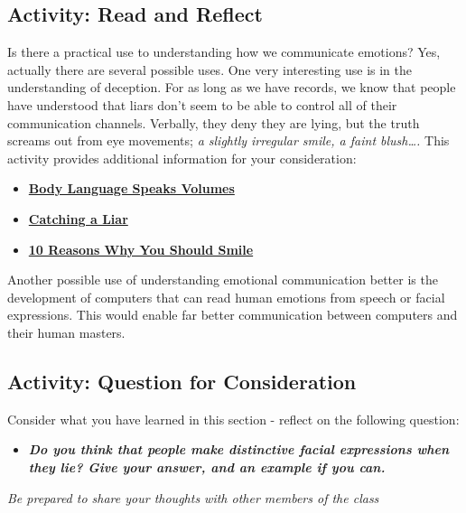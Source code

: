 \documentclass[
]{book}
\providecommand{\tightlist}{%
  \setlength{\itemsep}{0pt}\setlength{\parskip}{0pt}}
\begin{document}
\hypertarget{activity-read-and-reflect-13}{%
\subsection*{Activity: Read and Reflect}\label{activity-read-and-reflect-13}}

\begin{reflect}
Is there a practical use to understanding how we communicate emotions? Yes, actually there are several possible uses. One very interesting use is in the understanding of deception. For as long as we have records, we know that people have understood that liars don't seem to be able to control all of their communication channels. Verbally, they deny they are lying, but the truth screams out from eye movements; \emph{a slightly irregular smile, a faint blush\ldots.} This activity provides additional information for your consideration:

\begin{itemize}
\tightlist
\item
  \href{http://www.positive-way.com/body.htm}{\textbf{Body Language Speaks Volumes}}\\
\item
  \href{http://www.sciencedaily.com/releases/1999/05/990528003127.htm}{\textbf{Catching a Liar}}\\
\item
  \href{https://www.lifehack.org/358476/10-reasons-you-should-smile-more-often}{\textbf{10 Reasons Why You Should Smile}}
\end{itemize}

Another possible use of understanding emotional communication better is the development of computers that can read human emotions from speech or facial expressions. This would enable far better communication between computers and their human masters.
\end{reflect}

\hypertarget{activity-question-for-consideration-5}{%
\subsection*{Activity: Question for Consideration}\label{activity-question-for-consideration-5}}

\begin{reflect}
Consider what you have learned in this section - reflect on the following question:

\begin{itemize}
\tightlist
\item
  \textbf{\emph{Do you think that people make distinctive facial expressions when they lie? Give your answer, and an example if you can.}}
\end{itemize}

\emph{Be prepared to share your thoughts with other members of the class}
\end{reflect}
\end{document}
